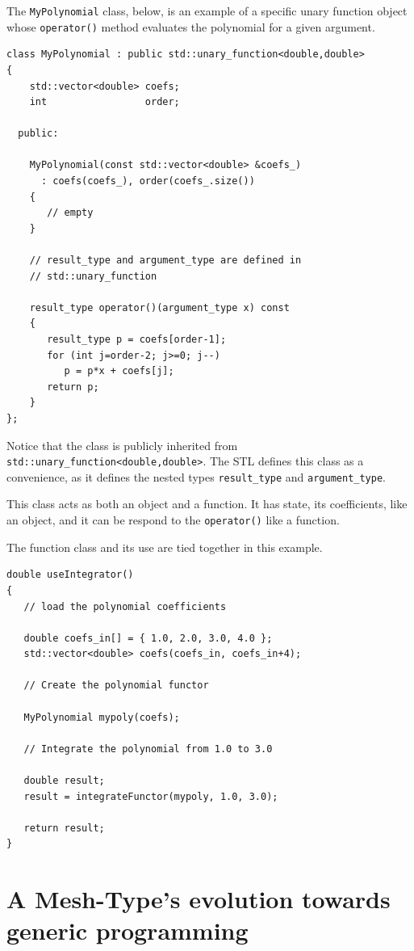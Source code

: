 \documentclass[reqno]{lanl}
\begin{document}
The \texttt{MyPolynomial} class, below, is 
an example of a specific unary function object whose \texttt{operator()}
method evaluates the polynomial for a given argument.
%
 \begin{verbatim}
class MyPolynomial : public std::unary_function<double,double>
{
    std::vector<double> coefs;
    int                 order;

  public:

    MyPolynomial(const std::vector<double> &coefs_)
      : coefs(coefs_), order(coefs_.size())
    {
       // empty
    }

    // result_type and argument_type are defined in
    // std::unary_function

    result_type operator()(argument_type x) const
    {
       result_type p = coefs[order-1];
       for (int j=order-2; j>=0; j--)
          p = p*x + coefs[j];
       return p;
    }
};
\end{verbatim} \normalcolor
%
Notice that the class is publicly inherited from
\texttt{std::unary\_function<double,double>}.
The STL defines this class as a convenience, as it
defines the nested types \texttt{result\_type} and \texttt{argument\_type}.

This class acts as both an object and a function.
It has state, its coefficients, like an object, and it can be respond to the 
\texttt{operator()} like a function.

The function class and its use are tied together in this example.
%
 \begin{verbatim}
double useIntegrator()
{
   // load the polynomial coefficients

   double coefs_in[] = { 1.0, 2.0, 3.0, 4.0 };
   std::vector<double> coefs(coefs_in, coefs_in+4);

   // Create the polynomial functor

   MyPolynomial mypoly(coefs);

   // Integrate the polynomial from 1.0 to 3.0

   double result;
   result = integrateFunctor(mypoly, 1.0, 3.0);

   return result;
}
\end{verbatim} \normalcolor
%


\section{A Mesh-Type's evolution towards generic programming}
\end{document}
